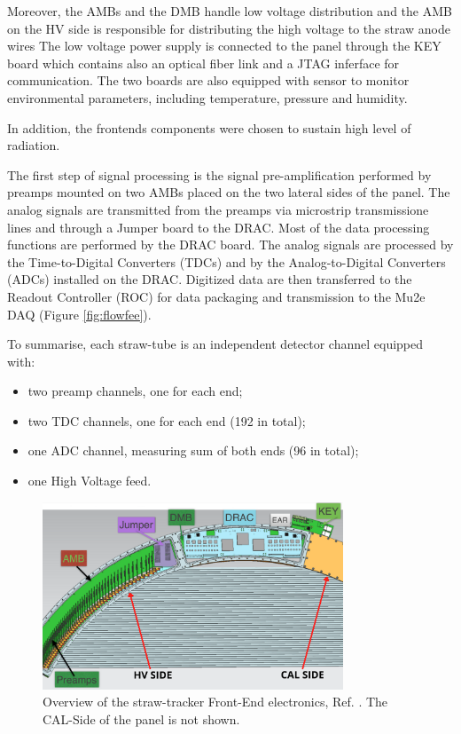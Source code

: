 Moreover, the AMBs and the DMB handle 
low voltage distribution and the AMB on the HV side is responsible for 
distributing the high voltage to the straw anode wires
The low voltage power supply is connected to the panel through the KEY board which 
contains also an optical fiber link and a JTAG inferface for communication.
The two boards are also equipped with sensor to monitor environmental parameters, 
including temperature, pressure and humidity.

In addition, the frontends components were chosen to sustain high level of radiation.

The first step of signal processing is the signal pre-amplification performed 
by preamps mounted on two AMBs placed on the two lateral sides of the panel. 
The analog signals are transmitted from the preamps via 
microstrip transmissione lines and through a Jumper board to the DRAC.
Most of the data processing functions are performed by the DRAC board. 
The analog signals are processed by the Time-to-Digital Converters 
(TDCs) and by the Analog-to-Digital Converters 
(ADCs) installed on the DRAC. Digitized data are then transferred to the Readout 
Controller (ROC) for data packaging and transmission to the Mu2e DAQ 
(Figure \ref{fig:flowfee}). 

To summarise, each straw-tube is an independent detector channel equipped with:
\begin{itemize}
    \item two preamp channels, one for each end;
    \item two TDC channels, one for each end (192 in total);
    \item one ADC channel, measuring sum of both ends (96 in total);
    \item one High Voltage feed.
\end{itemize}
\begin{figure}[!h]
\centering
\includegraphics[width =0.8\textwidth]{figures/png/Screenshot_20240131_111836.png}
\caption[Overview of the straw-tracker Front-End electronics.]{Overview of the straw-tracker Front-End electronics, Ref.  
\cite{vadimmu2e}. The CAL-Side of the panel is not shown.}
\label{fig:trackerfee}
\end{figure}


